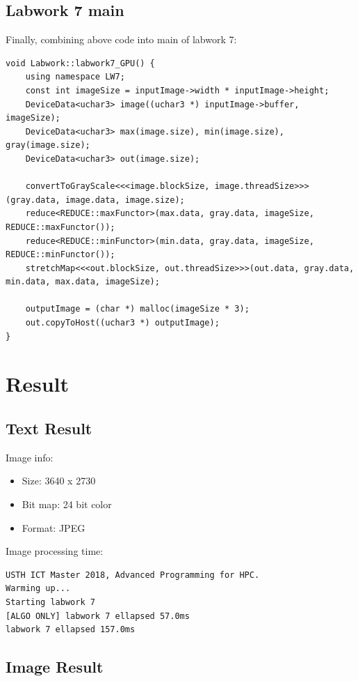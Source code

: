\documentclass{article}
\begin{document}
\subsection{Labwork 7 main}

Finally, combining above code into main of labwork 7:
\begin{Verbatim}[fontsize=\small]
void Labwork::labwork7_GPU() {
    using namespace LW7;
    const int imageSize = inputImage->width * inputImage->height;
    DeviceData<uchar3> image((uchar3 *) inputImage->buffer, imageSize);
    DeviceData<uchar3> max(image.size), min(image.size), gray(image.size);
    DeviceData<uchar3> out(image.size);

    convertToGrayScale<<<image.blockSize, image.threadSize>>>(gray.data, image.data, image.size);
    reduce<REDUCE::maxFunctor>(max.data, gray.data, imageSize, REDUCE::maxFunctor());
    reduce<REDUCE::minFunctor>(min.data, gray.data, imageSize, REDUCE::minFunctor());
    stretchMap<<<out.blockSize, out.threadSize>>>(out.data, gray.data, min.data, max.data, imageSize);

    outputImage = (char *) malloc(imageSize * 3);
    out.copyToHost((uchar3 *) outputImage);
}
\end{Verbatim}

\newpage
\section{Result}
\subsection{Text Result}

Image info:
\begin{itemize}
    \item Size: 3640 x 2730
    \item Bit map: 24 bit color
    \item Format: JPEG
\end{itemize}

\noindent Image processing time:
\begin{verbatim}
USTH ICT Master 2018, Advanced Programming for HPC.
Warming up...
Starting labwork 7
[ALGO ONLY] labwork 7 ellapsed 57.0ms
labwork 7 ellapsed 157.0ms
\end{verbatim}

\subsection{Image Result}
\end{document}
